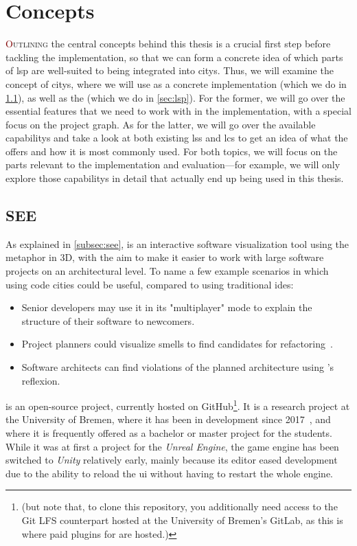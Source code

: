 \documentclass[../thesis]{subfiles}
\begin{document}
\chapter{Concepts}\label{ch:concepts}

\lettrine[lines=3]{\textcolor{Maroon}{O}}{utlining} the central concepts behind this thesis is a crucial first step before tackling the implementation, so that we can form a concrete idea of which parts of \gls{lsp} are well-suited to being integrated into \glspl{city}.
Thus, we will examine the concept of \glspl{city}, where we will use \SEE{} as a concrete implementation (which we do in \cref{sec:see}), as well as the  (which we do in \cref{sec:lsp}).
For the former, we will go over the essential features that we need to work with in the implementation, with a special focus on the project graph.
As for the latter, we will go over the available \glspl{capability} and take a look at both existing \glspl{ls} and \glspl{lc} to get an idea of what the  offers and how it is most commonly used.
For both topics, we will focus on the parts relevant to the implementation and evaluation---for example, we will only explore those \glspl{capability} in detail that actually end up being used in this thesis.

\section{SEE}\label{sec:see}

As explained in \cref{subsec:see}, \SEE{} is an interactive software visualization tool using the  metaphor in 3D, with the aim to make it easier to work with large software projects on an architectural level.
To name a few example scenarios in which using code cities could be useful, compared to using traditional \glspl{ide}:
\begin{itemize}
	\item Senior developers may use it in its "multiplayer" mode to explain the structure of their software to newcomers.
	\item Project planners could visualize \glspl{smell} to find candidates for refactoring~\cite{galperin2021}.
	\item Software architects can find violations of the planned architecture using \SEE{}'s \gls{reflexion}.
\end{itemize}

\SEE{} is an open-source project, currently hosted on GitHub\footnote{ (but note that, to clone this repository, you additionally need access to the Git LFS counterpart hosted at the University of Bremen's GitLab, as this is where paid plugins for \SEE{} are hosted.)}.
It is a research project at the University of Bremen, where it has been in development since 2017~\cite{ganser2017}, and where it is frequently offered as a bachelor or master project for the students.
While it was at first a project for the \emph{Unreal Engine}, the game engine has been switched to \emph{Unity} relatively early, mainly because its editor eased development due to the ability to reload the \gls*{ui} without having to restart the whole engine.
\end{document}
